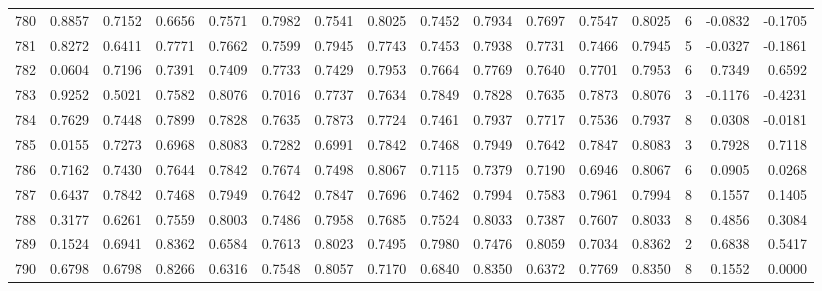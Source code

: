 \begin{tabular}{lrrrrrrrrrrrrrrr}
780 &      0.8857 &  0.7152 &  0.6656 &  0.7571 &  0.7982 &  0.7541 &  0.8025 &  0.7452 &  0.7934 &  0.7697 &   0.7547 &     0.8025 &      6 &                   -0.0832 &                    -0.1705 \\
781 &      0.8272 &  0.6411 &  0.7771 &  0.7662 &  0.7599 &  0.7945 &  0.7743 &  0.7453 &  0.7938 &  0.7731 &   0.7466 &     0.7945 &      5 &                   -0.0327 &                    -0.1861 \\
782 &      0.0604 &  0.7196 &  0.7391 &  0.7409 &  0.7733 &  0.7429 &  0.7953 &  0.7664 &  0.7769 &  0.7640 &   0.7701 &     0.7953 &      6 &                    0.7349 &                     0.6592 \\
783 &      0.9252 &  0.5021 &  0.7582 &  0.8076 &  0.7016 &  0.7737 &  0.7634 &  0.7849 &  0.7828 &  0.7635 &   0.7873 &     0.8076 &      3 &                   -0.1176 &                    -0.4231 \\
784 &      0.7629 &  0.7448 &  0.7899 &  0.7828 &  0.7635 &  0.7873 &  0.7724 &  0.7461 &  0.7937 &  0.7717 &   0.7536 &     0.7937 &      8 &                    0.0308 &                    -0.0181 \\
785 &      0.0155 &  0.7273 &  0.6968 &  0.8083 &  0.7282 &  0.6991 &  0.7842 &  0.7468 &  0.7949 &  0.7642 &   0.7847 &     0.8083 &      3 &                    0.7928 &                     0.7118 \\
786 &      0.7162 &  0.7430 &  0.7644 &  0.7842 &  0.7674 &  0.7498 &  0.8067 &  0.7115 &  0.7379 &  0.7190 &   0.6946 &     0.8067 &      6 &                    0.0905 &                     0.0268 \\
787 &      0.6437 &  0.7842 &  0.7468 &  0.7949 &  0.7642 &  0.7847 &  0.7696 &  0.7462 &  0.7994 &  0.7583 &   0.7961 &     0.7994 &      8 &                    0.1557 &                     0.1405 \\
788 &      0.3177 &  0.6261 &  0.7559 &  0.8003 &  0.7486 &  0.7958 &  0.7685 &  0.7524 &  0.8033 &  0.7387 &   0.7607 &     0.8033 &      8 &                    0.4856 &                     0.3084 \\
789 &      0.1524 &  0.6941 &  0.8362 &  0.6584 &  0.7613 &  0.8023 &  0.7495 &  0.7980 &  0.7476 &  0.8059 &   0.7034 &     0.8362 &      2 &                    0.6838 &                     0.5417 \\
790 &      0.6798 &  0.6798 &  0.8266 &  0.6316 &  0.7548 &  0.8057 &  0.7170 &  0.6840 &  0.8350 &  0.6372 &   0.7769 &     0.8350 &      8 &                    0.1552 &                     0.0000 \\

\end{tabular}
